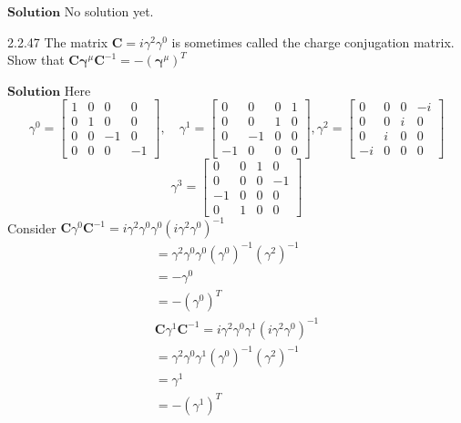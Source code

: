 \documentclass{styles/kaobook}
\begin{document}
$\boxed{\textbf{Solution}}$ No solution yet.
\begin{greenbox}{2.2.47}
The matrix $\mathbf{C}=i \gamma^{2} \gamma^{0}$ is sometimes called the charge conjugation matrix. Show that $\mathbf{C} \boldsymbol{\gamma}^{\mu} \mathbf{C}^{-1}=-\left(\boldsymbol{\gamma}^{\mu}\right)^{T}$
\end{greenbox}
$\boxed{\textbf{Solution}}$ Here
$$
\gamma^{0}=\begin{bmatrix}
1 & 0 & 0 & 0 \\
0 & 1 & 0 & 0 \\
0 & 0 & -1 & 0 \\
0 & 0 & 0 & -1
\end{bmatrix}, \quad \gamma^{1}=\begin{bmatrix}
0 & 0 & 0 & 1 \\
0 & 0 & 1 & 0 \\
0 & -1 & 0 & 0 \\
-1 & 0 & 0 & 0
\end{bmatrix}, \gamma^{2}=\begin{bmatrix}
0 & 0 & 0 & -i \\
0 & 0 & i & 0 \\
0 & i & 0 & 0 \\
-i & 0 & 0 & 0
\end{bmatrix}
$$
$$
\gamma^{3}=\begin{bmatrix}
0 & 0 & 1 & 0 \\
0 & 0 & 0 & -1 \\
-1 & 0 & 0 & 0 \\
0 & 1 & 0 & 0
\end{bmatrix}
$$
Consider $\mathbf{C} \gamma^{0} \mathbf{C}^{-1}=i \gamma^{2} \gamma^{0} \gamma^{0}\left(i \gamma^{2} \gamma^{0}\right)^{-1}$
$$
\begin{array}{l}
=\gamma^{2} \gamma^{0} \gamma^{0}\left(\gamma^{0}\right)^{-1}\left(\gamma^{2}\right)^{-1} \\
=-\gamma^{0} \\
=-\left(\gamma^{0}\right)^{T} \\
\mathbf{C} \gamma^{1} \mathbf{C}^{-1}=i \gamma^{2} \gamma^{0} \gamma^{1}\left(i \gamma^{2} \gamma^{0}\right)^{-1} \\
=\gamma^{2} \gamma^{0} \gamma^{1}\left(\gamma^{0}\right)^{-1}\left(\gamma^{2}\right)^{-1} \\
=\gamma^{1} \\
=-\left(\gamma^{1}\right)^{T}
\end{array}
$$
\end{document}
